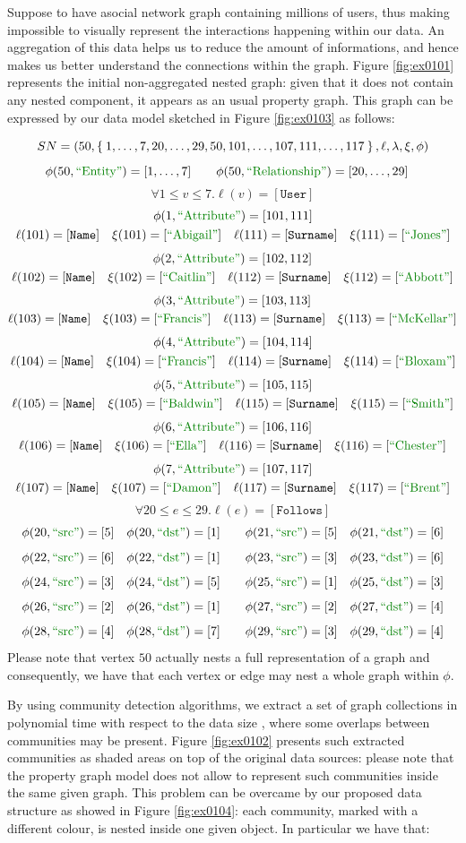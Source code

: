 \begin{example}\label{ex:partof}
	Suppose to have  asocial network graph containing millions of users, thus making impossible to visually represent the interactions happening within our data. An aggregation of this data helps us to reduce the amount of informations, and hence makes us better understand the connections within the graph. Figure \ref{fig:ex0101} represents the initial non-aggregated nested graph: given that it does not contain any nested component, it appears as an usual property graph. This graph can be expressed by our data model sketched in Figure \ref{fig:ex0103} as follows:
	
	\[SN=(50,\Set{1,\dots,7,20,\dots,29,50,101,\dots,107,111,\dots,117},\ell,\lambda,\xi,\phi)\]
	\[\phi(50,\ONTA)=[1,\dots,7]\qquad \phi(50,\RELA)=[20,\dots,29]\quad\]
	\[\forall 1\leq v\leq 7. \ell(v)=[\texttt{User}]\]
	\begin{gather*}\defSNU{1}{Abigail}{Jones}{1}\end{gather*}
	\begin{gather*}\defSNU{2}{Caitlin}{Abbott}{2}\end{gather*}
	\begin{gather*}\defSNU{3}{Francis}{McKellar}{3}\end{gather*}
	\begin{gather*}\defSNU{4}{Francis}{Bloxam}{4}\end{gather*}
	\begin{gather*}\defSNU{5}{Baldwin}{Smith}{5}\end{gather*}
	\begin{gather*}\defSNU{6}{Ella}{Chester}{6}\end{gather*}
	\begin{gather*}\defSNU{7}{Damon}{Brent}{7}\end{gather*}
	\[\forall 20\leq e\leq 29. \ell(e)=[\texttt{Follows}]\]
	\[\defSNE{e_0}{5}{1}{20}\qquad \defSNE{e_1}{5}{6}{21}\]
	\[\defSNE{e_2}{6}{1}{22}\qquad \defSNE{e_3}{3}{6}{23}\]
	\[\defSNE{e_4}{3}{5}{24}\qquad \defSNE{e_5}{1}{3}{25}\]
	\[\defSNE{e_6}{2}{1}{26}\qquad \defSNE{e_7}{2}{4}{27}\]
	\[\defSNE{e_8}{4}{7}{28}\qquad \defSNE{e_9}{3}{4}{29}\]
	Please note that vertex $50$ actually nests a full representation of a graph and consequently, we have that each vertex or edge may nest a whole graph within $\phi$.
	

By using community detection algorithms, we extract a set of graph collections in polynomial time with respect to the data size \cite{vanDongen2012}, where some overlaps between communities may be present. Figure  \ref{fig:ex0102} presents such extracted communities as shaded areas on top of the original data sources: please note that the property graph model does not allow to represent such communities inside the same given graph. This problem can be overcame by our proposed data structure as showed in Figure \vref{fig:ex0104}: each community, marked with a different colour, is nested inside one given object. In particular we have that:
	

\end{example}
